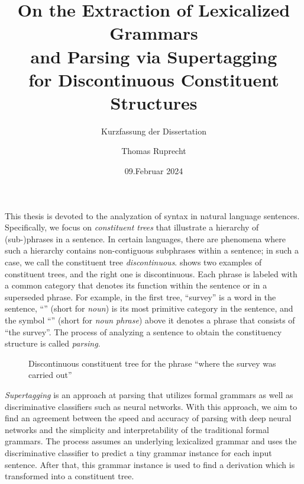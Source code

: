 \documentclass{scrartcl}
\author{Thomas Ruprecht}
\title{
    On the Extraction of Lexicalized Grammars\\and Parsing via Supertagging\\for Discontinuous Constituent Structures
}
\subtitle{Kurzfassung der Dissertation}
\date{09.\@ Februar 2024}
\begin{document}
    \maketitle

    This thesis is devoted to the analyzation of syntax in natural language sentences.
    Specifically, we focus on \emph{constituent trees} \citep[Section~3]{Cho56} that illustrate a hierarchy of (sub-)phrases in a sentence.
    In certain languages, there are phenomena where such a hierarchy contains non-contiguous subphrases within a sentence; in such a case, we call the constituent tree \emph{discontinuous}.
     shows two examples of constituent trees, and the right one is discontinuous.
    Each phrase is labeled with a common category that denotes its function within the sentence or in a superseded phrase.
    For example, in the first tree, ``survey'' is a word in the sentence, ``'' (short for \emph{noun}) is its most primitive category in the sentence, and the symbol ``'' (short for \emph{noun phrase}) above it denotes a phrase that consists of ``the survey''.
    The process of analyzing a sentence to obtain the constituency structure is called \emph{parsing}.

    \begin{wrapfigure}{r}{.4\linewidth}
        
        \caption{\label{fig:constituent}
            Discontinuous constituent tree for the phrase ``where the survey was carried out'' }
    \end{wrapfigure}
    \emph{Supertagging} \citep{bangalore1999supertagging} is an approach at parsing that utilizes formal grammars as well as discriminative classifiers such as neural networks.
    With this approach, we aim to find an agreement between the speed and accuracy of parsing with deep neural networks and the simplicity and interpretability of the traditional formal grammars.
    The process assumes an underlying lexicalized grammar and uses the discriminative classifier to predict a tiny grammar instance for each input sentence.
    After that, this grammar instance is used to find a derivation which is transformed into a constituent tree.
\end{document}
